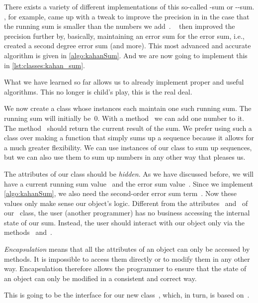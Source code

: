 There exists a variety of different implementations of this so-called \citeauthor{K1965PFRORTE}-sum or \citeauthor{K1965PFRORTE}-\citeauthor{B1968NSIMA}-sum.
, for example, came up with a tweak to improve the precision in \citeyear{N1974REVZSES} in the case that the running sum is smaller than the numbers we add~\cite{N1974REVZSES}.
~\cite{K2006AGKBSA} then improved the precision further by, basically, maintaining an error sum for the error sum, i.e., created a second degree error sum (and more).
This most advanced and accurate algorithm is given in \cref{algo:kahanSum}.
And we are now going to implement this in \cref{lst:classes:kahan_sum}.

What we have learned so far allows us to already implement proper and useful algorithms.
This no longer is child's play, this is the real deal.

We now create a class whose instances each maintain one such running sum.
The running sum will initially be~0.
With a method~ we can add one number to it.
The method~ should return the current result of the sum.
We prefer using such a class over making a function that simply sums up a sequence because it allows for a much greater flexibility.
We can use instances of our class to sum up sequences, but we can also use them to sum up numbers in any other way that pleases us.

The attributes of our class should be \emph{hidden}.
As we have discussed before, we will have a current running sum value~ and the error sum value~.
Since we implement \cref{algo:kahanSum}, we also need the second-order error sum term~.
Now these values only make sense  our object's logic.
Different from the attributes~ and~ of our~ class, the user (another programmer) has no business accessing the internal state of our sum.
Instead, the user should interact with our object only via the methods~ and~.%
%
\begin{definition}[Encapsulation]%
\emph{Encapsulation} means that all the attributes of an object can only be accessed by methods. %
It is impossible to access them directly or to modify them in any other way. %
Encapsulation therefore allows the programmer to ensure that the state of an object can only be modified in a consistent and correct way.%
\end{definition}%
%
This is going to be the interface for our new class~, which, in turn, is based on~\cite{K2006AGKBSA}.

